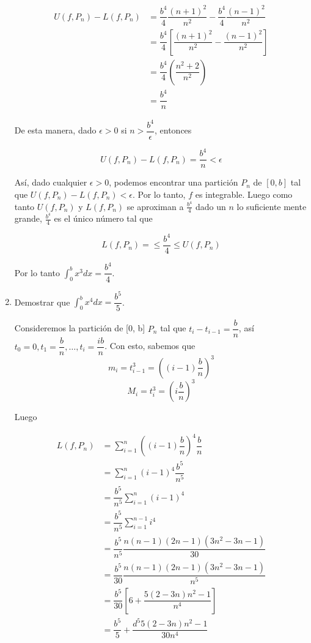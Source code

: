 \documentclass{report}
\begin{document}
\begin{enumerate}
        \begin{align*}
            U(f, P_n) - L(f, P_n) &= \dfrac{b^4}{4} \dfrac{(n+1)^2}{n^2} - \dfrac{b^4}{4} \dfrac{(n-1)^2}{n^2}\\
            &= \dfrac{b^4}{4} \left[\dfrac{(n+1)^2}{n^2} - \dfrac{(n-1)^2}{n^2}\right]\\
            &= \dfrac{b^4}{4} \left(\dfrac{n^2+2}{n^2}\right)\\
            &= \dfrac{b^4}{n}
        \end{align*}

        De esta manera, dado $\epsilon > 0$ si $n > \dfrac{b^4}{\epsilon}$, entonces

        $$U(f, P_n) - L(f, P_n) = \dfrac{b^4}{n} < \epsilon$$

        Así, dado cualquier $\epsilon > 0$, podemos encontrar una partición $P_n$ de $[0,b]$ tal que $U(f, P_n) - L(f, P_n) < \epsilon$. Por lo tanto, $f$ es integrable. Luego como tanto $U(f, P_n)$ y $L(f, P_n)$ se aproximan a $\frac{b^4}{4}$ dado un $n$ lo suficiente mente grande, $\frac{b^4}{4}$ es el único número tal que

        $$L(f, P_n) =  \leq \dfrac{b^4}{4} \leq U(f, P_n)$$

        Por lo tanto $\int_{0}^{b} x^3 dx = \dfrac{b^4}{4}$.

        \item Demostrar que $\int_{0}^{b}x^4dx = \dfrac{b^5}{5}$.

        Consideremos la partición de [0, b] $P_n$ tal que $t_i - t_{i-1} = \dfrac{b}{n}$, así $t_0 = 0, t_1 = \dfrac{b}{n}, \dots , t_i =\dfrac{ib}{n}$. Con esto, sabemos que
        $$m_i = t_{i-1}^3 = \left((i-1)\dfrac{b}{n}\right)^3$$
        $$M_i = t_{i}^3 = \left(i\dfrac{b}{n}\right)^3$$

        Luego

        \begin{align*}
            L(f, P_n) &= \sum_{i=1}^{n}\left((i-1)\dfrac{b}{n}\right)^4\dfrac{b}{n}\\
            &= \sum_{i=1}^{n}(i-1)^4\dfrac{b^5}{n^5}\\
            &= \dfrac{b^5}{n^5} \sum_{i=1}^{n}(i-1)^4\\
            &= \dfrac{b^5}{n^5} \sum_{i=1}^{n-1}i^4\\
            &= \dfrac{b^5}{n^5} \dfrac{n(n-1)(2n-1)(3n^2-3n-1)}{30}\\
            &= \dfrac{b^5}{30} \dfrac{n(n-1)(2n-1)(3n^2-3n-1)}{n^5}\\
            &= \dfrac{b^5}{30} \left[6 + \dfrac{5(2-3n)n^2-1}{n^4}\right]\\
            &= \dfrac{b^5}{5} + \dfrac{d^5 5(2-3n)n^2-1}{30n^4}
        \end{align*}


\end{enumerate}
\end{document}
